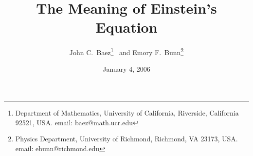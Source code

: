  

\hfuzz=6pt

\newcommand{\et}{\hspace{-0.08in}{\bf .}\hspace{0.1in}}
\newcommand{\BOX}{\hbox {$\sqcap$ \kern -1em $\sqcup$}}
\newcommand{\qed}{\hskip 3em \hbox{\BOX} \vskip 2ex}

\newenvironment{alphalist}{
\begin{list}{{\normalshape(\alph{letter})}}{\usecounter{letter}}
}{\end{list}}



\documentclass {article} 
\usepackage {amsfonts}



\title{The Meaning of Einstein's Equation}
\author{John C.\ Baez\footnote{
      Department of Mathematics, University of California,
      Riverside, California 92521, USA.
      email: baez@math.ucr.edu}
      \ and Emory F.\ Bunn\footnote{
      Physics Department, University of Richmond, Richmond, VA 23173, USA.
      email: ebunn@richmond.edu}}
\date{January 4, 2006}
\maketitle

\begin{abstract}
\noindent
This is a brief introduction to general relativity, designed for both
students and teachers of the subject.  While there are many excellent
expositions of general relativity, few adequately explain the
geometrical meaning of the basic equation of the theory: Einstein's
equation.  Here we give a simple formulation of this equation in terms
of the motion of freely falling test particles.  We also sketch some
of the consequences of this formulation and explain how it is
equivalent to the usual one in terms of tensors.  Finally, we include
an annotated bibliography of books, articles and websites suitable for
the student of relativity.

\end{abstract}

\section{Introduction}

